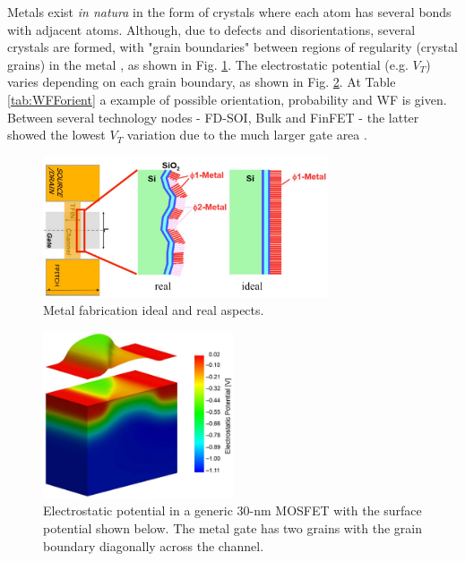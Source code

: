 \documentclass[pgmicro,mestrado,english]{iiufrgs}
\begin{document}
Metals exist \textit{in natura} in the form of crystals where each atom has several bonds with adjacent atoms. Although, due to defects and disorientations, several crystals are formed, with "grain boundaries" between regions of regularity (crystal grains) in the metal \cite{dadgour2008statistical}, as shown in Fig. \ref{fig:meinMetalFab}. The electrostatic potential (e.g. $V_T$) varies depending on each grain boundary, as shown in Fig. \ref{WFFelectros}. At Table \ref{tab:WFForient} a example of possible orientation, probability and WF is given. Between several technology nodes - FD-SOI, Bulk and FinFET - the latter showed the lowest $V_T$ variation due to the much larger gate area \cite{dadgour2008statistical}.

\begin{figure} []
        \centering
	\includegraphics[width=0.75\textwidth, trim={0 0 0 0},clip]{chrome_2019-05-15_16-55-31.pdf}
        \caption{Metal fabrication ideal and real aspects.}
        \label{fig:meinMetalFab}
\end{figure}

\begin{figure} []
        \centering
        \includegraphics[width=0.5\textwidth, trim={0 0 0 0},clip]{pic-selected-190513-1743-08.pdf}
        \caption{Electrostatic potential in a generic 30-nm MOSFET with the surface potential shown below. The metal gate has two grains with the grain boundary diagonally across the channel.}
        \label{WFFelectros}
\end{figure}
\end{document}
